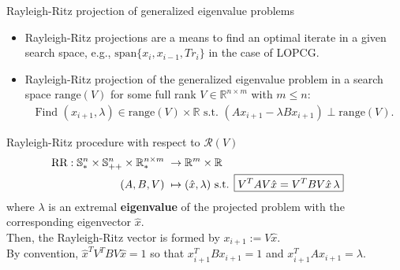 \documentclass[t,usepdftitle=false]{beamer}
\begin{document}
\begin{frame}{Rayleigh-Ritz projection of generalized eigenvalue problems}
\begin{itemize}
\item Rayleigh-Ritz projections are a means to find an optimal iterate in a given search space, e.g., $\mathrm{span}\{x_i,x_{i-1},Tr_i\}$ in the case of LOPCG.
\item Rayleigh-Ritz projection of the generalized eigenvalue problem in a search space $\text{range}(V)$ for some full rank $V\in\mathbb{R}^{n\times m}$ with $m\leq n$:
	\begin{align*}
	\text{Find }
	(x_{i+1},\lambda)\in\text{range}(V)\times \mathbb{R}
	\text{ s.t. }
	(Ax_{i+1}-\lambda Bx_{i+1})\perp\text{range}(V).
	\end{align*}
	\end{itemize}
	\vspace{-.25cm}
	\begin{block}{Rayleigh-Ritz procedure with respect to $\mathcal{R}(V)$}
		\vspace{-.3cm}
		\begin{align*}
			\hspace{-.5cm}
			\text{RR}:
			\mathbb{S}_*^{n}\times\mathbb{S}_{++}^{n}\times\mathbb{R}_*^{n\times m}&\;\rightarrow\mathbb{R}^{m}\times\mathbb{R}\\
			(A,B,V)&\;\mapsto (\hat{x},\lambda)
			\text{ s.t. }
			\boxed{V^TAV\hat{x}=V^TBV\hat{x}\,\lambda }
		\end{align*}
		where $\lambda$ is an extremal \textbf{eigenvalue}	
		of the projected problem with the corresponding eigenvector $\hat{x}.$\\
		\smallskip
		Then, the Rayleigh-Ritz vector is formed by $x_{i+1}:=V\hat{x}$.\\
		\smallskip
		By convention, $\hat{x}^TV^TBV\hat{x}=1$ so that $x_{i+1}^TBx_{i+1}=1$ and $x_{i+1}^TAx_{i+1}=\lambda$.
	\end{block}
\end{frame}		
	
\end{document}
